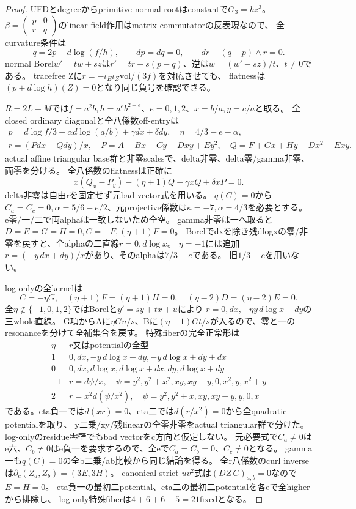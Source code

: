 \documentclass[a4paper,11pt]{ltjsarticle}
\theoremstyle{definition}
\begin{document}
\begin{proof}
UFDとdegreeからprimitive normal rootはconstantで$G_3=hz^3$。
$\beta=\left(\begin{smallmatrix}p&0\\r&q\end{smallmatrix}\right)$のlinear-field作用はmatrix commutatorの反表現なので、
全curvature条件は
\[
 q=2p-d\log(f/h),\qquad dp=dq=0,\qquad dr-(q-p)\wedge r=0.
\]
normal Borel$w'=tw+sz$は$r'=tr+s(p-q)$、逆は$w=(w'-sz)/t$、$t\ne0$である。
tracefree Zに$r=-\iota_E\iota_Z\mathrm{vol}/(3f)$を対応させても、
flatnessは$(p+d\log h)(Z)=0$となり同じ負号を確認できる。

$R=2L+M$では$f=a^2b,h=a^eb^{2-e}$、$e=0,1,2$、$x=b/a,y=c/a$と取る。
全closed ordinary diagonalと全八係数off-entryは
\[
\begin{gathered}
 p=d\log f/3+\alpha d\log(a/b)+\gamma dx+\delta dy,\quad
 \eta=4/3-e-\alpha,\\
 r=(Pdx+Qdy)/x,\quad
 P=A+Bx+Cy+Dxy+Ey^2,\quad
 Q=F+Gx+Hy-Dx^2-Exy.
\end{gathered}
\]
actual affine triangular base群と非零scalesで、delta非零、delta零/gamma非零、両零を分ける。
全八係数のflatnessは正確に
\[
 x(Q_x-P_y)-(\eta+1)Q-\gamma xQ+\delta xP=0.
\]
delta非零は自由rを固定せず元bad-vector式を用いる。
$q(C)=0$から$C_a=C_c=0,\alpha=5/6-e/2$、元projective係数は$\kappa=-7,\alpha=4/3$を必要とする。
e零/一/二で両alphaは一致しないため全空。
gamma非零は一へ取ると$D=E=G=H=0,C=-F,(\eta+1)F=0$。
Borelでdxを除き残dlogxの零/非零を戻すと、全alphaの二直線$r=0,d\log x$。
$\eta=-1$には追加$r=(-y\,dx+dy)/x$があり、そのalphaは$7/3-e$である。
旧$1/3-e$を用いない。

log-onlyの全kernelは
\[
 C=-\eta G,\quad(\eta+1)F=(\eta+1)H=0,\quad
 (\eta-2)D=(\eta-2)E=0.
\]
全$\eta\notin\{-1,0,1,2\}$ではBorelと$y'=sy+tx+u$により
$r=0,dx,-\eta y\,d\log x+dy$の三whole直線。
G項からAに$\eta Gu/s$、Bに$(\eta-1)Gt/s$が入るので、零と一のresonanceを分けて全補集合を戻す。
特殊fiberの完全正常形は
\[
\begin{array}{c|l}
 \eta&r\text{又はpotentialの全型}\\\hline
 1&0,dx,-y\,d\log x+dy,-y\,d\log x+dy+dx\\
 0&0,dx,d\log x,d\log x+dx,dy,d\log x+dy\\
 -1&r=d\psi/x,\quad\psi=y^2,y^2+x^2,xy,xy+y,0,x^2,y,x^2+y\\
 2&r=x^2d(\psi/x^2),\quad\psi=y^2,y^2+x,xy,xy+y,y,0,x
\end{array}
\]
である。eta負一では$d(xr)=0$、eta二では$d(r/x^2)=0$から全quadratic potentialを取り、
y二乗/xy/残linearの全零非零をactual triangular群で分けた。
log-onlyのresidue零壁でもbad vectorをc方向と仮定しない。
元必要式で$C_a\ne0$はe六、$C_b\ne0$はe負一を要求するので、全eで$C_a=C_b=0$、$C_c\ne0$となる。
gamma一も$q(C)=0$の全b二乗/ab比較から同じ結論を得る。
全r八係数のcurl inverseは$\partial_c(Z_a,Z_b)=(3E,3H)$。
canonical strict $uv^2$式は$(DZ\,C)_{a,b}=0$なので$E=H=0$。
eta負一の最初二potential、eta二の最初二potentialを各eで全higherから排除し、
log-only特殊fiberは$4+6+6+5=21$fixedとなる。


\end{proof}
\end{document}

